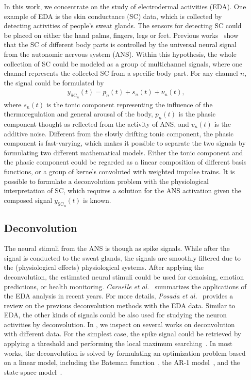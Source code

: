 \documentclass[10pt,conference]{ieeeconf}
\providecommand{\rm}[1]{\mathrm{#1}}
\begin{document}
In this work, we concentrate on the study of electrodermal activities (EDA). One example of EDA is the skin conductance (SC) data, which is collected by detecting activities of people's sweat glands. The sensors for detecting SC could be placed on either the hand palms, fingers, legs or feet. Previous works~\cite{fowles1981publication,amin2019robust} show that the SC of different body parts is controlled by the universal neural signal from the autonomic nervous system (ANS). Within this hypothesis, the whole collection of SC could be modeled as a group of multichannel signals, where one channel represents the collected SC from a specific body part. For any channel $n$, the signal could be formulated by
\begin{align} \label{fml:scmodel}
  y_{\rm{SC}_\mathit{n}}(t) = p_n(t) + s_n(t) + \nu_n(t),
\end{align}
%
where $s_n(t)$ is the tonic component representing the influence of the thermoregulation and general arousal of the
body, $p_n(t)$ is the phasic component thought as reflected from the activity of ANS, and $v_n(t)$ is the additive noise. Different from the slowly drifting tonic component, the phasic component is fast-varying, which makes it possible to separate the two signals by formulating two different mathematical models. Either the tonic component and the phasic component could be regarded as a linear composition of different basis functions, or a group of kernels convoluted with weighted impulse trains. It is possible to formulate a deconvolution problem with the physiological interpretation of SC, which requires a solution for the ANS activation given the composed signal  $y_{\rm{SC}_n}(t)$  is known.

\subsection{Deconvolution}

The neural stimuli from the ANS is though as spike signals. While after the signal is conducted to the sweat glands, the signals are smoothly filtered due to the (physiological effects) physiological systems. After applying the deconvolution, the estimated neural stimuli could be used for denoising, emotion predictions, or health monitoring. \textit{Caruelle et al.}~\cite{caruelle2019use} summarizes the applications of the EDA analysis in recent years. For more details, \textit{Posada et al.}~\cite{posada2020innovations} provides a review on the previous deconvolution methods with the EDA data. Similar to EDA, the other kinds of signals could be also used for studying the neuron activities by deconvolution. In , we inspect on several works on deconvolution with different data. For the simplest case, the spike signal could be retrieved by applying a threshold and performing the local maximum searching~\cite{kaur2016remote,subramanian2019systematic}. In most works, the deconvolution is solved by formulating an optimization problem based on a linear model, including the Bateman function~\cite{savazzi2019estimation,greco2014electrodermal,greco2015cvxeda,amin2019tonic,hernando2017feature,wickramasuriya2019skin}, the AR-1 model~\cite{friedrich2017fast}, and the state-space model~\cite{kazemipour2017fast,amin2019robust}. 
\end{document}
